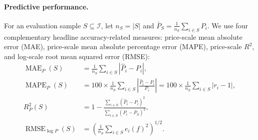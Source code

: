 \documentclass[10pt]{article}
\theoremstyle{definition}
\newcommand{\1}{\mathbf{1}}
\begin{document}
\paragraph{Predictive performance.}
{For an evaluation sample $S\subseteq\mathcal{I}$, let $n_S=|S|$ and $\bar P_S=\frac{1}{n_S}\sum_{i\in S}P_i$. We use four complementary headline accuracy-related measures: price-scale mean absolute error (MAE), price-scale mean absolute percentage error (MAPE), price-scale $R^2$, and log-scale root mean squared error (RMSE):}
\begin{align}
\label{eq:predictive_metrics}
\operatorname{MAE}_{P}(S)
&=
\frac{1}{n_S}\sum_{i\in S}\left|\widehat P_i-P_i\right|,
\\
{\operatorname{MAPE}_{P}(S)}
&{=100\times
\frac{1}{n_S}
\sum_{i\in S}
\left|
\frac{\widehat P_i-P_i}{P_i}
\right|
=100\times 
\frac{1}{n_S}\sum_{i\in S}|r_i-1|},
\\
R^2_{P}(S)
&=
1-
\frac{\sum_{i\in S}(\widehat P_i-P_i)^2}
{\sum_{i\in S}(P_i-\bar P_S)^2},
\\
\operatorname{RMSE}_{\log P}(S)
&=
\left(
\frac{1}{n_S}\sum_{i\in S}e_i(f)^2
\right)^{1/2}.
\end{align}
\end{document}

